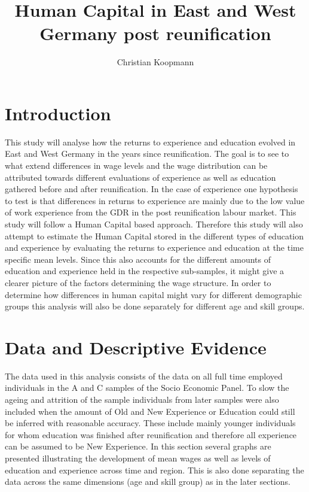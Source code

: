 \documentclass{article}
\begin{document}
\title{Human Capital in East and West Germany post reunification}
\author{Christian Koopmann}
\maketitle

\section{Introduction}
This study will analyse how the returns to experience and education evolved in East and West Germany in the years since reunification. The goal is to see to what extend differences in wage levels and the wage distribution can be attributed towards different evaluations of experience as well as education gathered before and after reunification. In the case of experience one hypothesis to test is that differences in returns to experience are mainly due to the low value of work experience from the GDR in the post reunification labour market. This study will follow a Human Capital based approach. Therefore this study will also attempt to estimate the Human Capital stored in the different types of education and experience by evaluating the returns to experience and education at the time specific mean levels. Since this also accounts for the different amounts of education and experience held in the respective sub-samples, it might give a clearer picture of the factors determining the wage structure. In order to determine how differences in human capital might vary for different demographic groups this analysis will also be done separately for different age and skill groups.

\section{Data and Descriptive Evidence}
The data used in this analysis consists of the data on all full time employed individuals in the A and C samples of the Socio Economic Panel. To slow the ageing and attrition of the sample individuals from later samples were also included when the amount of Old and New Experience or Education could still be inferred with reasonable accuracy. These include mainly younger individuals for whom education was finished after reunification and therefore all experience can be assumed to be New Experience. In this section several graphs are presented illustrating the development of mean wages as well as levels of education and experience across time and region. This is also done separating the data across the same dimensions (age and skill group) as in the later sections.
\end{document}
